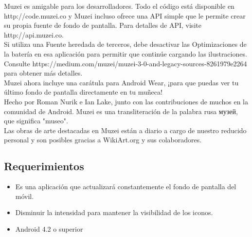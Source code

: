 \documentclass[12pt,a4paper]{article}
\begin{document}
Muzei es amigable para los desarrolladores. Todo el código está disponible en http://code.muzei.co y Muzei incluso ofrece una API simple que le permite crear su propia fuente de fondo de pantalla. Para detalles de API, visite http://api.muzei.co.\\

Si utiliza una Fuente heredada de terceros, debe desactivar las Optimizaciones de la batería en esa aplicación para permitir que continúe cargando las ilustraciones. Consulte https://medium.com/muzei/muzei-3-0-and-legacy-sources-8261979e2264 para obtener más detalles.\\


Muzei ahora incluye una carátula para Android Wear, ¡para que puedas ver tu último fondo de pantalla directamente en tu muñeca!\\


Hecho por Roman Nurik e Ian Lake, junto con las contribuciones de muchos en la comunidad de Android. Muzei es una transliteración de la palabra rusa музей, que significa "museo".\\

Las obras de arte destacadas en Muzei están a diario a cargo de nuestro reducido personal y son posibles gracias a WikiArt.org y sus colaboradores.\\


\subsection{Requerimientos}

\begin{itemize}
\item Es una aplicación que actualizará constantemente el fondo de pantalla del móvil.\\
\item Disminuir la intensidad para mantener la visibilidad de los iconos.\\
\item Android 4.2 o superior\\
\end{itemize}
\end{document}
